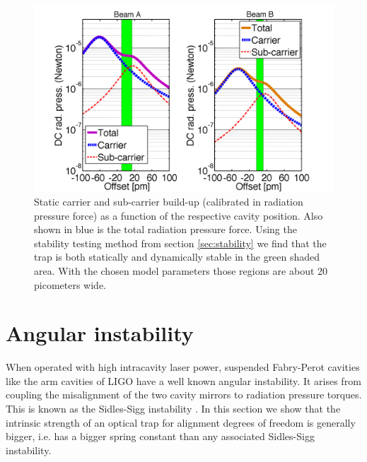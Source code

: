 \begin{figure}[htbp]
	\centering
		\includegraphics[width=15cm]{./figures/DC_offset_paper3.pdf}
	\caption[Stable Optical Spring Detuning Range]{Static carrier and sub-carrier build-up (calibrated in radiation pressure force) as a function of the respective cavity position. Also shown in blue is the total radiation pressure force. Using the stability testing method from section \ref{sec:stability} we find that the trap is both statically and dynamically stable in the green shaded area.
With the chosen model parameters those regions are about 
20 picometers wide.}
	\label{fig:stability_region}
\end{figure}



\section{Angular instability}
\label{sec:IV} 
When operated with high intracavity laser power, suspended Fabry-Perot cavities like the arm cavities of LIGO have a well known angular instability. It  arises from coupling the misalignment of the two cavity mirrors to radiation pressure torques. This is known as the Sidles-Sigg instability \cite{Sidles06}. In this section we show that the intrinsic strength of an optical trap for alignment degrees of freedom is generally bigger, i.e. has a bigger spring constant than any associated Sidles-Sigg instability. 

